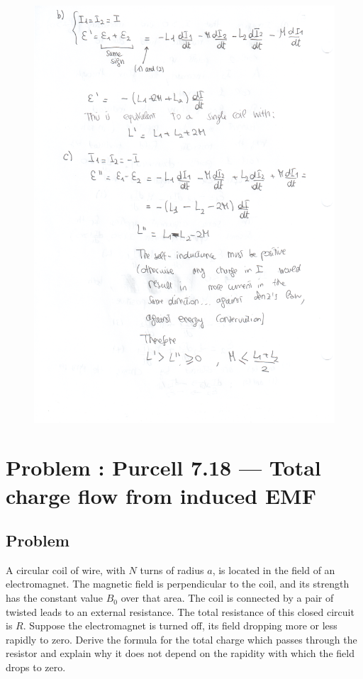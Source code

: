 \documentclass[solutions]{esg8022pset}
\begin{document}
    \begin{figure}[H]
    \centering
    \includegraphics{ps9_5b}
  \end{figure}
\section{Problem \thesection: Purcell 7.18 --- Total charge flow from induced EMF}
\subsection{Problem}
A circular coil of wire, with $N$ turns of radius $a$, is located in the field of an electromagnet.
The magnetic field is perpendicular to the coil, and its strength has the constant value $B_{0}$ over that area.
The coil is connected by a pair of twisted leads to an external resistance. The total resistance of this closed
 circuit is $R$. Suppose the electromagnet is turned off, its field dropping more or less rapidly to zero. Derive
  the formula for the total charge which passes through the resistor and explain why it does not depend on the rapidity
  with which the field drops to zero.
\end{document}
